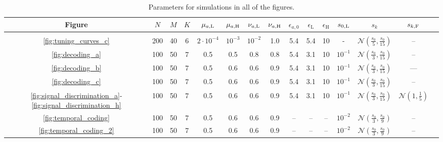 \begin{table}[!tb]
	\centering
	{\small
		\begin{tabular}{ccccccccccccccc}
			Figure & $N$& $M$ & $K$ & $\mu_{a, \text L}$ & $\mu_{a, \text H}$ & $\nu_{a, \text L}$ & $\nu_{a, \text H}$ & $\epsilon_{a, 0}$ & $\epsilon_{\text {L}}$  & $\epsilon_{\text {H}}$  & $s_{0, \text L}$ & $s_k$ & $s_{k, \text F}$\\[0.1cm]
			
			\hline \\[-0.2cm]
			\smallskip
			
			\ref{fig:tuning_curves_c} & 200 & 40 & 6 & $2\cdot 10^{-4}$ & $10^{-3}$ & $10^{-2}$ & 1.0 & 5.4 & 5.4 & 10  & - & $ \mathcal N\left(\frac{s_0}{5}, \frac{s_0}{15}\right)$ & --\\
			
			\ref{fig:decoding_a} & 100 & 50 & 7 & 0.5 & 0.5 & 0.8 & 0.8 & 5.4 & 3.1 & 10  & $10^{-1}$ & $ \mathcal N\left(\frac{s_0}{3}, \frac{s_0}{15}\right)$ & -- \\
			
			\ref{fig:decoding_b} & 100 & 50 & 7 & 0.5 & 0.6 & 0.6 & 0.9 & 5.4 & 3.1 & 10 & $10^{-1}$ & $ \mathcal N\left(\frac{s_0}{3}, \frac{s_0}{15}\right)$ & ---\\
			
			\ref{fig:decoding_c} & 100 & 50 & 7 & 0.5 & 0.6 & 0.6 & 0.9 & 5.4 & 3.1 & 10 & $10^{-1}$ & $ \mathcal N\left(\frac{s_0}{3}, \frac{s_0}{15}\right)$ & -- \\
			
			\ref{fig:signal_discrimination_a}-\ref{fig:signal_discrimination_h} & 100 & 50 & 7 & 0.5 & 0.6 & 0.6 & 0.9 & 5.4 & 3.1 & 10 & $10^{-1}$ & $ \mathcal N\left(\frac{s_0}{3}, \frac{s_0}{15}\right)$ & $ \mathcal N(1, \frac{1}{5})$ \\
			
			\ref{fig:temporal_coding} & 100 & 50 & 7 & 0.5 & 0.6 & 0.6 & 0.9 & -- & -- & -- & $10^{-2}$ & $ \mathcal N\left(\frac{s_0}{3}, \frac{s_0}{9}\right)$ & -- \\
			
			\ref{fig:temporal_coding_2} & 100 & 50 & 7 & 0.5 & 0.6 & 0.6 & 0.9 & -- & -- & -- & $10^{-2}$ & $ \mathcal N\left(\frac{s_0}{3}, \frac{s_0}{9}\right)$ & -- \\
		\end{tabular}
	}
	\caption{Parameters for simulations in all of the figures.}
	\label{tab:params}
\end{table}



